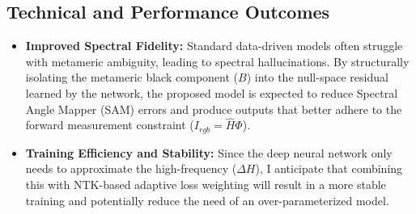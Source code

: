 \documentclass[stu]{apa7}
\begin{document}
\subsection{Technical and Performance Outcomes}
\begin{itemize}
    \item \textbf{Improved Spectral Fidelity:} Standard data-driven models often struggle with metameric ambiguity, leading to spectral hallucinations. By structurally isolating the metameric black component ($B$) into the null-space residual learned by the network, the proposed model is expected to reduce Spectral Angle Mapper (SAM) errors and produce outputs that better adhere to the forward measurement constraint ($I_{rgb} = \hat{H} \Phi$).
    
    \item \textbf{Training Efficiency and Stability:} Since the deep neural network only needs to approximate the high-frequency ($\Delta H$), I anticipate that combining this with NTK-based adaptive loss weighting will result in a more stable training and potentially reduce the need of an over-parameterized model.
\end{itemize}

\printbibliography

\appendix

\end{document}
